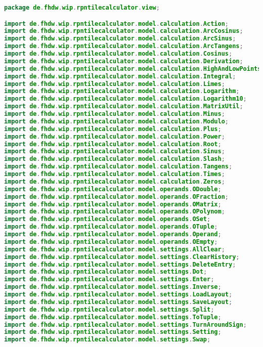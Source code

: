 \begin{lstlisting}[caption=TileMapping,label=list:TileMapping,language=Java]
package de.fhdw.wip.rpntilecalculator.view;

import de.fhdw.wip.rpntilecalculator.model.calculation.Action;
import de.fhdw.wip.rpntilecalculator.model.calculation.ArcCosinus;
import de.fhdw.wip.rpntilecalculator.model.calculation.ArcSinus;
import de.fhdw.wip.rpntilecalculator.model.calculation.ArcTangens;
import de.fhdw.wip.rpntilecalculator.model.calculation.Cosinus;
import de.fhdw.wip.rpntilecalculator.model.calculation.Derivation;
import de.fhdw.wip.rpntilecalculator.model.calculation.HighAndLowPoints;
import de.fhdw.wip.rpntilecalculator.model.calculation.Integral;
import de.fhdw.wip.rpntilecalculator.model.calculation.Limes;
import de.fhdw.wip.rpntilecalculator.model.calculation.Logarithm;
import de.fhdw.wip.rpntilecalculator.model.calculation.Logarithm10;
import de.fhdw.wip.rpntilecalculator.model.calculation.MatrixUtil;
import de.fhdw.wip.rpntilecalculator.model.calculation.Minus;
import de.fhdw.wip.rpntilecalculator.model.calculation.Modulo;
import de.fhdw.wip.rpntilecalculator.model.calculation.Plus;
import de.fhdw.wip.rpntilecalculator.model.calculation.Power;
import de.fhdw.wip.rpntilecalculator.model.calculation.Root;
import de.fhdw.wip.rpntilecalculator.model.calculation.Sinus;
import de.fhdw.wip.rpntilecalculator.model.calculation.Slash;
import de.fhdw.wip.rpntilecalculator.model.calculation.Tangens;
import de.fhdw.wip.rpntilecalculator.model.calculation.Times;
import de.fhdw.wip.rpntilecalculator.model.calculation.Zeros;
import de.fhdw.wip.rpntilecalculator.model.operands.ODouble;
import de.fhdw.wip.rpntilecalculator.model.operands.OFraction;
import de.fhdw.wip.rpntilecalculator.model.operands.OMatrix;
import de.fhdw.wip.rpntilecalculator.model.operands.OPolynom;
import de.fhdw.wip.rpntilecalculator.model.operands.OSet;
import de.fhdw.wip.rpntilecalculator.model.operands.OTuple;
import de.fhdw.wip.rpntilecalculator.model.operands.Operand;
import de.fhdw.wip.rpntilecalculator.model.operands.OEmpty;
import de.fhdw.wip.rpntilecalculator.model.settings.AllClear;
import de.fhdw.wip.rpntilecalculator.model.settings.ClearHistory;
import de.fhdw.wip.rpntilecalculator.model.settings.DeleteEntry;
import de.fhdw.wip.rpntilecalculator.model.settings.Dot;
import de.fhdw.wip.rpntilecalculator.model.settings.Enter;
import de.fhdw.wip.rpntilecalculator.model.settings.Inverse;
import de.fhdw.wip.rpntilecalculator.model.settings.LoadLayout;
import de.fhdw.wip.rpntilecalculator.model.settings.SaveLayout;
import de.fhdw.wip.rpntilecalculator.model.settings.Split;
import de.fhdw.wip.rpntilecalculator.model.settings.ToTuple;
import de.fhdw.wip.rpntilecalculator.model.settings.TurnAroundSign;
import de.fhdw.wip.rpntilecalculator.model.settings.Setting;
import de.fhdw.wip.rpntilecalculator.model.settings.Swap;


\end{lstlisting}
